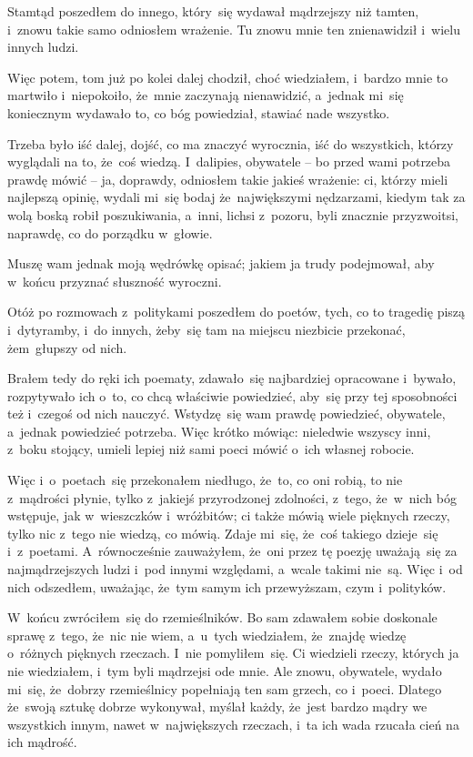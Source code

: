 Stamtąd poszedłem do innego, który~się wydawał mądrzejszy niż tamten,
i~znowu takie samo odniosłem wrażenie. Tu znowu mnie ten znienawidził
i~wielu innych ludzi.

Więc potem, tom już po kolei dalej chodził, choć wiedziałem, i~bardzo
mnie to martwiło i~niepokoiło, że~mnie zaczynają nienawidzić, a~jednak
mi~się koniecznym wydawało to, co bóg powiedział, stawiać nade
wszystko.

Trzeba było iść dalej, dojść, co ma znaczyć wyrocznia, iść do
wszystkich, którzy wyglądali na to, że~coś wiedzą. I~dalipies,
obywatele -- bo przed wami potrzeba prawdę mówić -- ja, doprawdy,
odniosłem takie jakieś wrażenie: ci, którzy mieli najlepszą opinię,
wydali mi~się bodaj że~największymi nędzarzami, kiedym tak za wolą
boską robił poszukiwania, a~inni, lichsi z~pozoru, byli znacznie
przyzwoitsi, naprawdę, co do porządku w~głowie.

Muszę wam jednak moją wędrówkę opisać; jakiem ja trudy podejmował, aby
w~końcu przyznać słuszność wyroczni.

Otóż po rozmowach z~politykami poszedłem do poetów, tych, co to
tragedię piszą i~dytyramby, i~do innych, żeby~się tam na miejscu
niezbicie przekonać, żem~głupszy od nich.

Brałem tedy do ręki ich poematy, zdawało~się najbardziej opracowane
i~bywało, rozpytywało ich o~to, co chcą właściwie powiedzieć, aby~się
przy tej sposobności też i~czegoś od nich nauczyć. Wstydzę~się wam
prawdę powiedzieć, obywatele, a~jednak powiedzieć potrzeba. Więc
krótko mówiąc: nieledwie wszyscy inni, z~boku stojący, umieli lepiej
niż sami poeci mówić o~ich własnej robocie.

Więc i~o~poetach~się przekonałem niedługo, że~to, co oni robią, to nie
z~mądrości płynie, tylko z~jakiejś przyrodzonej zdolności, z~tego,
że~w~nich bóg wstępuje, jak w~wieszczków i~wróżbitów; ci także mówią
wiele pięknych rzeczy, tylko nic z~tego nie wiedzą, co mówią. Zdaje
mi~się, że~coś takiego dzieje~się i~z~poetami. A~równocześnie
zauważyłem, że~oni przez tę poezję uważają~się za najmądrzejszych
ludzi i~pod innymi względami, a~wcale takimi nie~są. Więc i~od nich
odszedłem, uważając, że~tym samym ich przewyższam, czym i~polityków.

W~końcu zwróciłem~się do rzemieślników. Bo sam zdawałem sobie
doskonale sprawę z~tego, że~nic nie wiem, a~u~tych wiedziałem,
że~znajdę wiedzę o~różnych pięknych rzeczach. I~nie pomyliłem~się. Ci
wiedzieli rzeczy, których ja nie wiedziałem, i~tym byli mądrzejsi ode
mnie. Ale znowu, obywatele, wydało mi~się, że~dobrzy rzemieślnicy
popełniają ten sam grzech, co i~poeci. Dlatego że~swoją sztukę dobrze
wykonywał, myślał każdy, że~jest bardzo mądry we wszystkich innym,
nawet w~największych rzeczach, i~ta ich wada rzucała cień na ich
mądrość.


